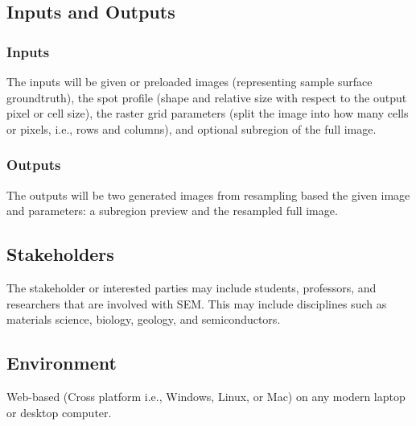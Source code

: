 \documentclass{article}
\begin{document}
\subsection{Inputs and Outputs}
\subsubsection{Inputs}
The inputs will be given or preloaded images (representing sample surface
groundtruth), the spot profile (shape and relative size with respect to the
output pixel or cell size), the raster grid parameters (split the image into how
many cells or pixels, i.e., rows and columns), and optional subregion of the
full image.
\subsubsection{Outputs} The outputs will be two generated images
from resampling based the given image and parameters: a subregion preview and
the resampled full image.

\subsection{Stakeholders}
The stakeholder or interested parties may include
students, professors, and researchers that are involved with SEM. This may
include disciplines such as materials science, biology, geology, and
semiconductors.

\subsection{Environment}
Web-based (Cross platform i.e., Windows, Linux, or Mac)
on any modern laptop or desktop computer.
\end{document}

